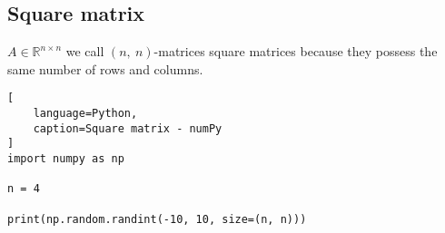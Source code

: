 \subsection{Square matrix}

$A \in \mathbb{R}^{n\times n}$
we call $(n,\ n)$-matrices square matrices because they possess the same number of rows and columns.


\begin{lstlisting}[
    language=Python,
    caption=Square matrix - numPy
]
import numpy as np

n = 4

print(np.random.randint(-10, 10, size=(n, n)))
\end{lstlisting}


